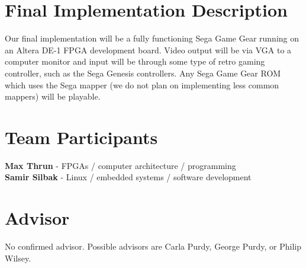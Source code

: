 \documentclass[12pt]{article}
\begin{document}
\section*{Final Implementation Description}
Our final implementation will be a fully functioning Sega Game Gear running on an Altera DE-1 FPGA
development board. Video output will be via VGA to a computer monitor and input will be through some type of retro
gaming controller, such as the Sega Genesis controllers. Any Sega Game Gear ROM which uses the Sega mapper 
(we do not plan on implementing less common mappers) will be playable.

\section*{Team Participants}
{\bf Max Thrun} - FPGAs / computer architecture / programming  
\\
{\bf Samir Silbak} - Linux / embedded systems / software development

\section*{Advisor}
No confirmed advisor. Possible advisors are Carla Purdy, George Purdy, or Philip Wilsey.
\end{document}

